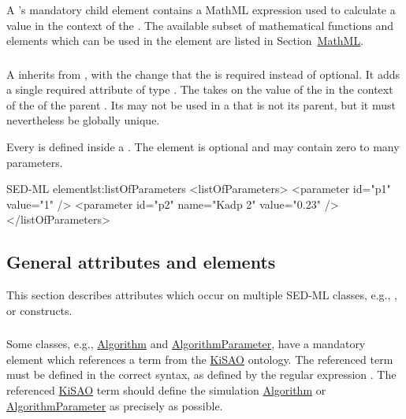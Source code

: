 \begin{blockChanged}
\subsubsection{}
\label{sec:math}
A \Calculation's mandatory child element  contains a MathML expression used to calculate a value in the context of the \Calculation.  The available subset of mathematical functions and elements which can be used in the \Math element are listed in Section~\hyperref[sec:mathML]{MathML}.

\subsubsection{}
\label{sec:parameter}
\label{class:listOfParameters}
A \Parameter inherits from \SedBase, with the change that the  is required instead of optional.  It adds a single required attribute  of type .  The  takes on the value of the  in the context of the \Math of the parent \Calculation.  Its  may not be used in a \Calculation that is not its parent, but it must nevertheless be globally unique.

Every \Parameter is defined inside a \ListOfParameters.  The element is optional and may contain zero to many parameters.

\begin{myXmlLst}{SED-ML  element}{lst:listOfParameters}
<listOfParameters>
	<parameter id="p1" value="1" />
	<parameter id="p2" name="Kadp 2" value="0.23" />
</listOfParameters>
\end{myXmlLst}


\subsection{General attributes and elements}
This section describes attributes which occur on multiple SED-ML classes, e.g., \hyperref[sec:kisaoid]{}, or \hyperref[sec:listOf]{} constructs.
\label{sec:generalAttributes}

\end{blockChanged}
\subsubsection{}
\label{sec:kisaoid}
Some classes, e.g., \hyperref[class:algorithm]{Algorithm} and \hyperref[class:algorithmParameter]{AlgorithmParameter}, have a mandatory element  which references a term from the \hyperref[sec:kisao]{KiSAO} ontology. The referenced term must be defined in the correct syntax, as defined by the regular expression . The referenced \hyperref[sec:kisao]{KiSAO} term  should define the simulation \hyperref[class:algorithm]{Algorithm} or \hyperref[class:algorithmParameter]{AlgorithmParameter} as precisely as possible.


